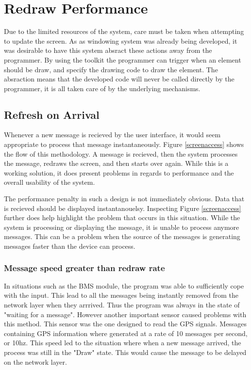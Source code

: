 

\section{Redraw Performance}

Due to the limited resources of the system, care must be taken when attempting to update the screen. As as windowing system was already being developed, it was desirable to have this system absract these actions away from the programmer. By using the toolkit the programmer can trigger when an element should be draw, and specify the drawing code to draw the element. The absraction means that the developed code will never be called directly by the programmer, it is all taken care of by the underlying mechanisms.

\subsection{Refresh on Arrival}

Whenever a new message is recieved by the user interface, it would seem appropriate to process that message instantaneously. Figure \ref{screenaccess} shows the flow of this methodology. A message is recieved, then the system processes the message, redraws the screen, and then starts over again. While this is a working solution, it does present problems in regards to performance and the overall usability of the system.


The performance penalty in such a design is not immediately obvious. Data that is recieved should be displayed instantanouelsy. Inspecting Figure \ref{screenaccess} further does help highlight the problem that occurs in this situation. While the system is processing or displaying the message, it is unable to process anymore messages. This can be a problem when the source of the messages is generating messages faster than the device can process.

\subsubsection{Message speed greater than redraw rate}

In situations such as the BMS module, the program was able to sufficiently cope with the input. This lead to all the messages being instantly removed from the network layer when they arrrived. Thus the program was always in the state of "waiting for a message". However another important sensor caused problems with this method. This sensor was the one designed to read the GPS signals. Messages containing GPS information where generated at a rate of 10 messages per second, or 10hz. This speed led to the situation where when a new message arrived, the process was still in the "Draw" state. This would cause the message to be delayed on the network layer.

